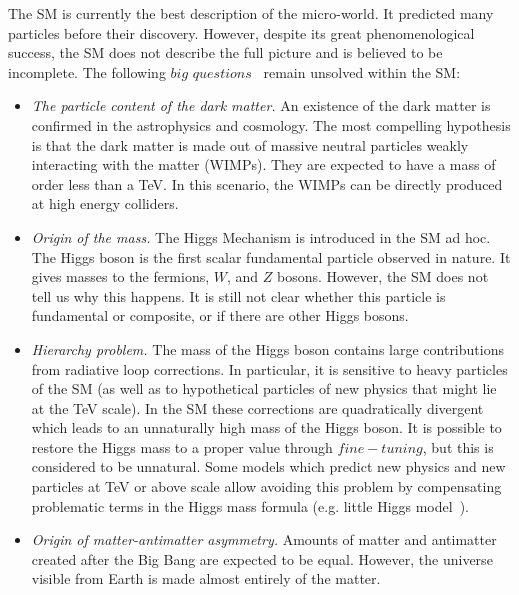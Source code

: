 The SM is currently the best description of the micro-world. It predicted many particles before their discovery. However, despite its great phenomenological success, the SM does not describe the full picture and is believed to be incomplete. The following $big$ $questions$~\cite{Gershtein:2013iqa} remain unsolved within the SM:
\begin{itemize}
\item \textit{The particle content of the dark matter.} An existence of the dark matter is confirmed in the astrophysics and cosmology. The most compelling hypothesis is that the dark matter is made out of massive neutral particles weakly interacting with the matter (WIMPs). They are expected to have a mass of order less than a TeV. In this scenario, the WIMPs can be directly produced at high energy colliders.
\item \textit{Origin of the mass.} The Higgs Mechanism is introduced in the SM ad hoc. The Higgs boson is the first scalar fundamental particle observed in nature. It gives masses to the fermions, $W$, and $Z$ bosons. However, the SM does not tell us why this happens. It is still not clear whether this particle is fundamental or composite, or if there are other Higgs bosons.
\item \textit{Hierarchy problem.} The mass of the Higgs boson contains large contributions from radiative loop corrections. In particular, it is sensitive to heavy particles of the SM (as well as to hypothetical particles of new physics that might lie at the TeV scale). 
In the SM these corrections are quadratically divergent which leads to an unnaturally high mass of the Higgs boson. It is possible to restore the Higgs mass to a proper value through $fine-tuning$, but this is considered to be unnatural. Some models which predict new physics and new particles at TeV or above scale allow avoiding this problem
by compensating problematic terms in the Higgs mass formula (e.g. little Higgs model~\cite{Brak}).
\item \textit{Origin of matter-antimatter asymmetry.} Amounts of matter and antimatter created after the Big Bang are expected to be equal. However, the universe visible from Earth is made almost entirely of the matter.

\end{itemize}
